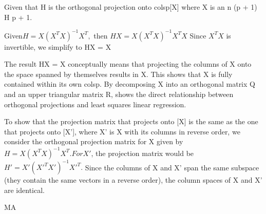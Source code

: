 \documentclass[12pt]{article}
\begin{document}
\begin{enumerate}


Given that H is the orthogonal projection onto colsp[X] where X is an n \times (p + 1)  H  p + 1.



Given$ H = X(X^TX)^{-1}X^T,$ then $HX = X(X^TX)^{-1}X^TX$ Since $X^TX$ is invertible, we simplify to HX = X



The result HX = X conceptually means that projecting the columns of X onto the space spanned by themselves results in X. This shows that X is fully contained within its own colsp. By decomposing X into an orthogonal matrix Q and an upper triangular matrix R, shows the direct relationship between orthogonal projections and least squares linear regression.



To show that the projection matrix that projects onto [X] is the same as the one that projects onto [X'], where X' is X with its columns in reverse order, we consider the orthogonal projection matrix for X given by $ H = X(X^TX)^{-1}X^T. For X'$, the projection matrix would be $H' = X'(X'^TX')^{-1}X'^T.$ Since the columns of X and X' span the same subspace (they contain the same vectors in a reverse order), the column spaces of X and X' are identical.



MA



\end{enumerate}
\end{document}
